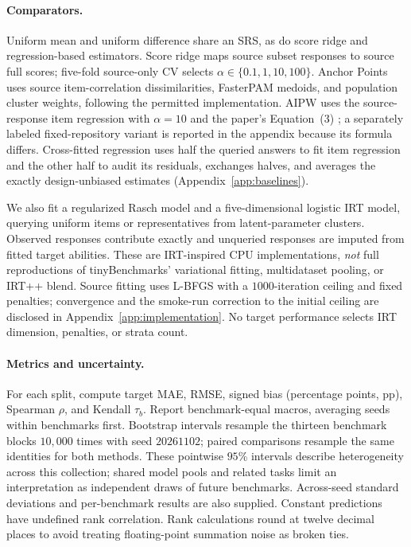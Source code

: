 \documentclass{article}
\begin{document}
\paragraph{Comparators.}
Uniform mean and uniform difference share an SRS, as do score ridge and regression-based estimators. Score ridge maps source subset responses to source full scores; five-fold source-only CV selects $\alpha\in\{0.1,1,10,100\}$. Anchor Points uses source item-correlation dissimilarities, FasterPAM medoids, and population cluster weights, following the permitted implementation. AIPW uses the source-response item regression with $\alpha=10$ and the paper's Equation~(3) \citep{zhang2025}; a separately labeled fixed-repository variant is reported in the appendix because its formula differs. Cross-fitted regression uses half the queried answers to fit item regression and the other half to audit its residuals, exchanges halves, and averages the exactly design-unbiased estimates (Appendix~\ref{app:baselines}).

We also fit a regularized Rasch model and a five-dimensional logistic IRT model, querying uniform items or representatives from latent-parameter clusters. Observed responses contribute exactly and unqueried responses are imputed from fitted target abilities. These are IRT-inspired CPU implementations, \emph{not} full reproductions of tinyBenchmarks' variational fitting, multidataset pooling, or IRT++ blend. Source fitting uses L-BFGS with a $1000$-iteration ceiling and fixed penalties; convergence and the smoke-run correction to the initial ceiling are disclosed in Appendix~\ref{app:implementation}. No target performance selects IRT dimension, penalties, or strata count.

\paragraph{Metrics and uncertainty.}
For each split, compute target MAE, RMSE, signed bias (percentage points, pp), Spearman $\rho$, and Kendall $\tau_b$. Report benchmark-equal macros, averaging seeds within benchmarks first. Bootstrap intervals resample the thirteen benchmark blocks $10{,}000$ times with seed $20261102$; paired comparisons resample the same identities for both methods. These pointwise $95$\% intervals describe heterogeneity across this collection; shared model pools and related tasks limit an interpretation as independent draws of future benchmarks. Across-seed standard deviations and per-benchmark results are also supplied. Constant predictions have undefined rank correlation. Rank calculations round at twelve decimal places to avoid treating floating-point summation noise as broken ties.
\end{document}
